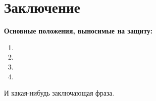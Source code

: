 \chapter*{Заключение}						%

\textbf{Основные положения, выносимые на защиту:}
\begin{enumerate}
  \item 
  \item 
  \item 
  \item
\end{enumerate}

И какая-нибудь заключающая фраза.

\clearpage